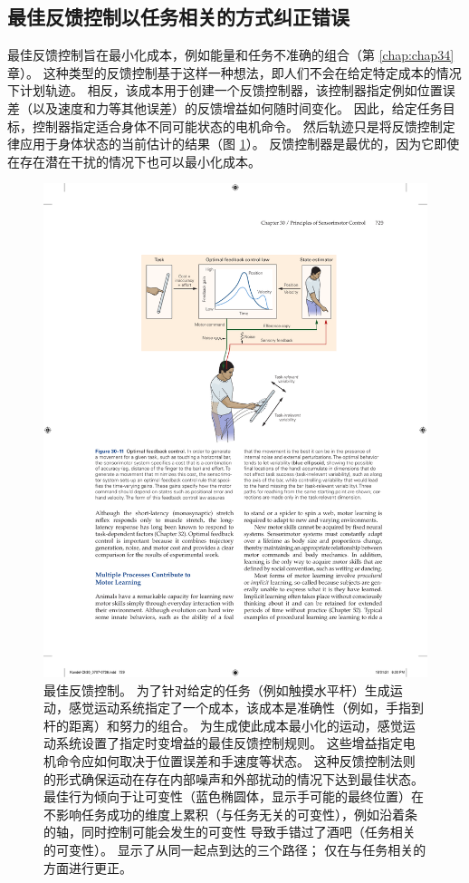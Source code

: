 \subsection{最佳反馈控制以任务相关的方式纠正错误}

最佳反馈控制旨在最小化成本，例如能量和任务不准确的组合（第 \ref{chap:chap34} 章）。
这种类型的反馈控制基于这样一种想法，即人们不会在给定特定成本的情况下计划轨迹。
相反，该成本用于创建一个反馈控制器，该控制器指定例如位置误差（以及速度和力等其他误差）的反馈增益如何随时间变化。
因此，给定任务目标，控制器指定适合身体不同可能状态的电机命令。
然后轨迹只是将反馈控制定律应用于身体状态的当前估计的结果（图 \ref{fig:30_11}）。
反馈控制器是最优的，因为它即使在存在潜在干扰的情况下也可以最小化成本。


\begin{figure}[htbp]
	\centering
	\includegraphics[width=0.7\linewidth]{chap30/fig_30_11}
	\caption{最佳反馈控制。 为了针对给定的任务（例如触摸水平杆）生成运动，感觉运动系统指定了一个成本，该成本是准确性（例如，手指到杆的距离）和努力的组合。 为生成使此成本最小化的运动，感觉运动系统设置了指定时变增益的最佳反馈控制规则。 这些增益指定电机命令应如何取决于位置误差和手速度等状态。 这种反馈控制法则的形式确保运动在存在内部噪声和外部扰动的情况下达到最佳状态。 最佳行为倾向于让可变性（蓝色椭圆体，显示手可能的最终位置）在不影响任务成功的维度上累积（与任务无关的可变性），例如沿着条的轴，同时控制可能会发生的可变性 导致手错过了酒吧（任务相关的可变性）。 显示了从同一起点到达的三个路径； 仅在与任务相关的方面进行更正。}
	\label{fig:30_11}
\end{figure}


